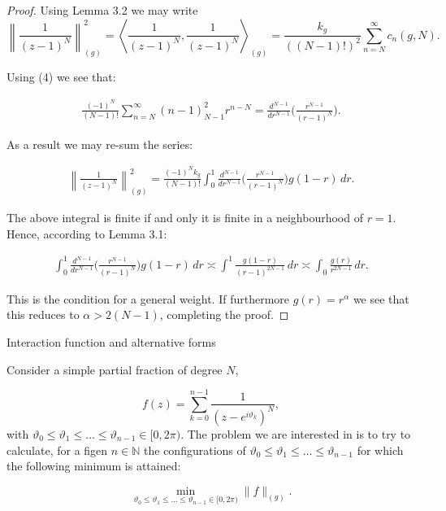 \documentclass{amsart}[11pt]
\makeatletter
\newcommand{\N}{\mathbb{N}} %
\newcommand{\vth}{\vartheta}
\renewcommand\subsection{\@startsection{subsection}{2}%
\z@{-.5\linespacing\@plus-.7\linespacing}{.5\linespacing}%
{\normalfont\scshape}}
\theoremstyle{definition}
\makeatother
\begin{document}
\begin{proof}
Using Lemma 3.2 we may write
\[
\left\| \frac{1}{(z - 1)^N} \right\|^2_{(g)} =
\left\langle \frac{1}{(z - 1)^N}, \frac{1}{(z - 1)^N} \right\rangle_{(g)} = \frac{k_g}{((N-1)!)^2} \sum_{n=N}^{\infty}c_n(g,N) .
\]

Using (4) we see that:

\begin{gather*}
    \frac{(-1)^N}{(N-1)!}\sum_{n = N}^{\infty}(n-1)^2_{N-1}r^{n-N} = \frac{d^{N-1}}{dr^{N-1}}\bigg( \frac{r^{N-1}}{(r-1)^N} \bigg).
\end{gather*}

As a result we may re-sum the series:

\begin{gather*}
    \left\| \frac{1}{(z - 1)^N} \right\|^2_{(g)} = \frac{(-1)^N k_g}{(N-1)!} \int_0^1 \frac{d^{N-1}}{dr^{N-1}}\bigg( \frac{r^{N-1}}{(r-1)^N} \bigg) g(1-r) \,dr.
\end{gather*}

The above integral is finite if and only it is finite in a neighbourhood of $r=1$. Hence, according to Lemma 3.1:

\begin{gather*}
    \int_0^1 \frac{d^{N-1}}{dr^{N-1}}\bigg( \frac{r^{N-1}}{(r-1)^N} \bigg) g(1-r) \,dr \asymp \int^1 \frac{g(1-r)}{(r-1)^{2N-1}}\,dr \asymp \int_0 \frac{g(r)}{r^{2N-1}}\,dr.
\end{gather*}

This is the condition for a general weight. If furthermore $g(r) = r^{\alpha}$ we see that this reduces to \( \alpha > 2(N - 1) \), completing the proof.
\end{proof}

\subsection{Interaction function and alternative forms}


Consider a simple partial fraction of degree \( N \),

\[
f(z) = \sum_{k=0}^{n-1} \frac{1}{(z - e^{i\vth_k})^N},
\]
with \( \vth_0 \leq \vth_1 \leq \dots \leq \vth_{n-1} \in [0, 2\pi) \). The problem we are interested in is to try to calculate, for a figen $n \in \N$ the configurations of \( \vth_0 \leq \vth_1 \leq \dots \leq \vth_{n-1}\) for which the following minimum is attained:

\[
\min_{\vth_0 \leq \vth_1 \leq \dots \leq \vth_{n-1} \in [0,2\pi)} \| f \|_{(g)}.
\]
\end{document}
